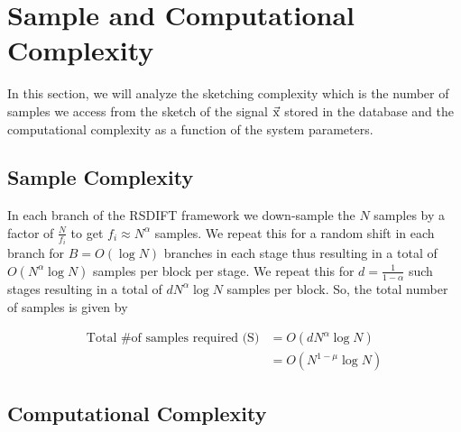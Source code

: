 \section{Sample and Computational Complexity}
\label{Sec:Complexity}
In this section, we will analyze the sketching complexity which is the  number of samples we access from the sketch of the signal $\vec{\mathrm{x}}$ stored in the database and the computational complexity as a function of the system parameters.

\subsection{\bf Sample Complexity}\label{subsec:SampleComplexity}
In each branch of the RSDIFT framework we down-sample the $N$ samples by a factor of $\frac{N}{f_i}$ to get $f_i\approx N^{\alpha}$ samples. We repeat this for a random shift in each branch for $B=O(\log N)$ branches in each stage thus resulting in a total of $O(N^{\alpha}\log N)$ samples per block per stage. We repeat this for $d = \frac{1}{1-\alpha}$ such stages resulting in a total of $dN^{\alpha}\log N$ samples per block. So, the total number of samples is given by

\begin{align*}
\text{Total \# of samples required (S)} &= O \left(dN^{\alpha}\log N\right)\\
   &=   O(N^{1-\mu}\log N)
\end{align*}


\subsection{\bf Computational Complexity} \label{subsec:ComputationComplexity}


